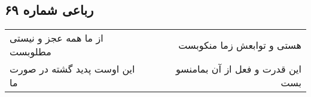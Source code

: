 \begin{center}
\section*{رباعی شماره ۶۹}
\label{sec:sh069}
\begin{longtable}{l p{0.5cm} r}
از ما همه عجز و نیستی مطلوبست
&&
هستی و توابعش زما منکوبست
\\
این اوست پدید گشته در صورت ما
&&
این قدرت و فعل از آن بمامنسو بست
\\
\end{longtable}
\end{center}
